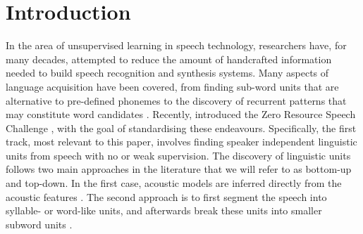 \section{Introduction}
\label{sec:introduction}
In the area of unsupervised learning in speech technology, researchers have, for many decades, attempted to reduce the amount of handcrafted information needed to build speech recognition and synthesis systems.
Many aspects of language acquisition have been covered, from finding sub-word units that are alternative to pre-defined phonemes \parencite{LeeEtAl1988,SvendsenEtAl1989,BacchianiEtAl1996,huijbregts2011unsupervised, OGrady:2008up} to the discovery of recurrent patterns that may constitute word candidates \cite{Rasanen2011149, park2008unsupervised, Aimetti2010, StoutenEtAl2008phonepatterns, DriesenEtAl2009adaptivenon-negative, gs:VanhainenAndSalvi2012Interspeech, gs:VanhainenAndSalvi2014ICASSP}.
Recently, \citeauthor{versteegh2015zero} introduced the Zero Resource Speech Challenge \parencite{versteegh2015zero}, with the goal of standardising these endeavours.
Specifically, the first track, most relevant to this paper, involves finding speaker independent linguistic units from speech with no or weak supervision.
The discovery of linguistic units follows two main approaches in the literature that we will refer to as bottom-up and top-down. 
In the first case, acoustic models are inferred directly from the acoustic features \parencite{varadarajan2008unsupervised, lee2012nonparametric, siu2014unsupervised, chen2015parallel, zhang2010towards, versteegh2016zero, heck2016unsupervised, synnaeve2016temporal}.
The second approach is to first segment the speech into syllable- or word-like units, and afterwards break these units into smaller subword units \parencite{jansen2013weak, park2008unsupervised, jansen2011efficient, versteegh2015zero, jansen2011towards, jansen2013weak, synnaeve2014phonetics, thiolliere2015hybrid, versteegh2016zero, zeghidour2016deep, kamper2015unsupervised, renshaw2015comparison}.

